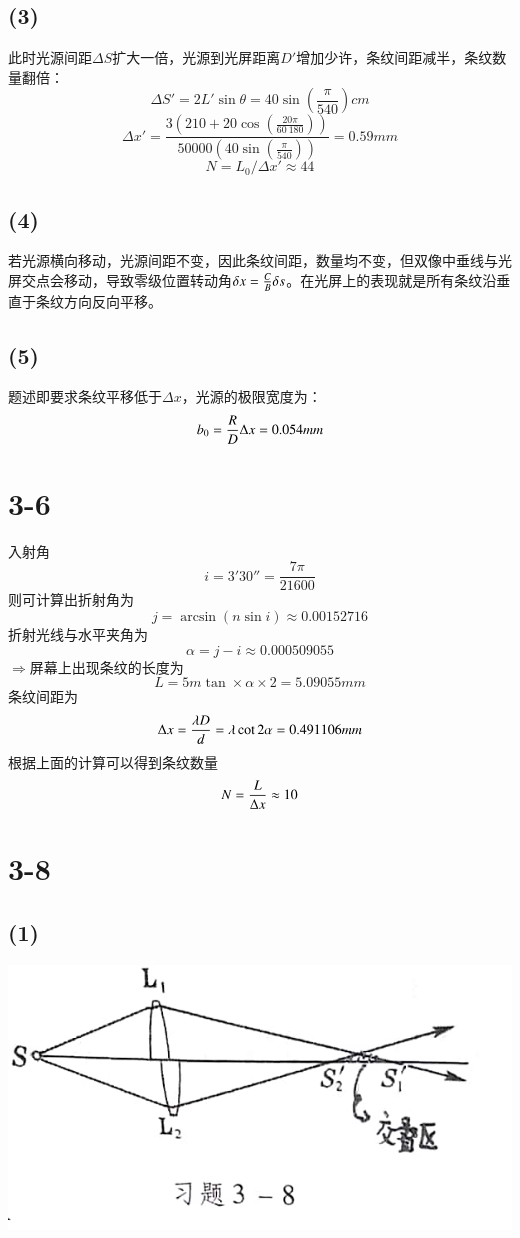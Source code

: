 \documentclass[UTF8,9pt]{ctexart}
\begin{document}
	\subsection{(3)}
此时光源间距$\Delta S$扩大一倍，光源到光屏距离$D'$增加少许，条纹间距减半，条纹数量翻倍：
$$\Delta S'=2L'\sin\theta=40 \sin \left(\frac{\pi }{540}\right)cm$$
$$\Delta x'=\frac{3 \left(210+20 \cos \left(\frac{20 \pi }{60\ 180}\right)\right)}{50000 \left(40 \sin \left(\frac{\pi }{540}\right)\right)}=0.59mm$$
$$N=L_0/\Delta x'\approx 44$$
\subsection{(4)}
若光源横向移动，光源间距不变，因此条纹间距，数量均不变，但双像中垂线与光屏交点会移动，导致零级位置转动角$\delta x=\frac{C}{B}\delta s$。在光屏上的表现就是所有条纹沿垂直于条纹方向反向平移。
\subsection{(5)}
题述即要求条纹平移低于$\Delta x$，光源的极限宽度为：
$$b_0=\frac{R}{D}\Delta x=0.054mm$$
\section{3-6}
入射角$$i=3'30''=\frac{7 \pi }{21600}$$
则可计算出折射角为$$j=\arcsin\left(n\sin i\right)\approx 0.00152716$$
折射光线与水平夹角为$$\alpha=j-i \approx 0.000509055$$
$\Rightarrow $屏幕上出现条纹的长度为$$L=5m\tan \times \alpha \times 2=5.09055mm$$
条纹间距为$$\Delta x=\frac{\lambda D}{d}=\lambda \cot2\alpha=0.491106mm$$
根据上面的计算可以得到条纹数量$$N=\frac{L}{\Delta x}\approx 10$$
\section{3-8}
\subsection{(1)}
\begin{center}
	\includegraphics[scale=0.4]{2.jpg}\\
\end{center}
\end{document}
